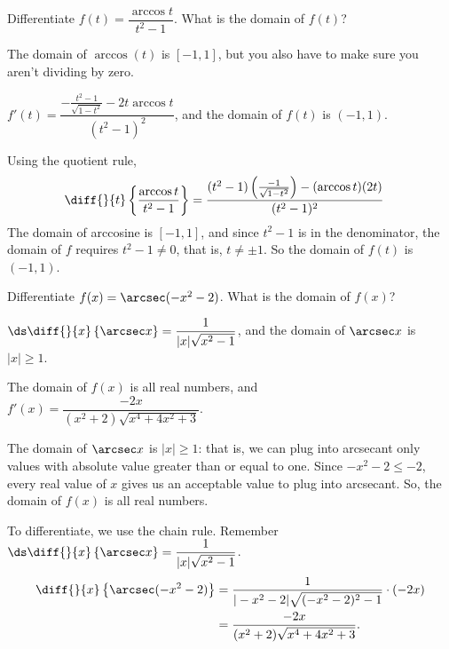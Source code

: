 \begin{Mquestion}
Differentiate $f(t)=\dfrac{\arccos t}{t^2-1}$. What is the domain of $f(t)$?
\end{Mquestion}
\begin{hint}
The domain of $\arccos(t)$ is $[-1,1]$, but you also have to make sure you aren't dividing by zero.
\end{hint}
\begin{answer}
$f'(t)=\dfrac{-\frac{t^2-1}{\sqrt{1-t^2}}-2t\arccos t}{(t^2-1)^2}$, and the domain of $f(t)$ is $(-1,1)$.
\end{answer}
\begin{solution}
Using the quotient rule,
\begin{align*}
\diff{}{t}\left\{\dfrac{\arccos t}{t^2-1}\right\}&=
\frac{(t^2-1)\left(\frac{-1}{\sqrt{1-t^2}}\right)-(\arccos t)(2t)}{(t^2-1)^2}
\end{align*}
The domain of arccosine is $[-1,1]$, and since $t^2-1$ is in the denominator, the domain of $f$ requires $t^2-1 \neq 0$, that is, $t \neq \pm 1$. So the domain of $f(t)$ is $(-1,1)$.
\end{solution}



\begin{question}
Differentiate $f(x)=\arcsec(-x^2-2)$. What is the domain of $f(x)$?
\end{question}
\begin{hint}
$\ds\diff{}{x}\left\{\arcsec x\right\} = \dfrac{1}{|x|\sqrt{x^2-1}}$, and the domain of $\arcsec x$ is $|x|\ge1$.
\end{hint}
\begin{answer}
The domain of $f(x)$ is all real numbers, and
$f'(x)=\dfrac{-2x}{(x^2+2)\sqrt{x^4+4x^2+3}}$.
\end{answer}
\begin{solution}
The domain of $\arcsec x$ is $|x| \geq 1$: that is, we can plug into arcsecant only values with absolute value greater than or equal to one. Since $-x^2-2 \leq -2$, every real value of $x$ gives us an acceptable value to plug into arcsecant. So, the domain of $f(x)$ is all real numbers.

To differentiate, we use the chain rule. Remember $\ds\diff{}{x}\left\{\arcsec x\right\} = \dfrac{1}{|x|\sqrt{x^2-1}}$.
\begin{align*}
\diff{}{x}\left\{\arcsec(-x^2-2)\right\}&=
\dfrac{1}{|-x^2-2|\sqrt{(-x^2-2)^2-1}}\cdot(-2x)\\
&=\dfrac{-2x}{(x^2+2)\sqrt{x^4+4x^2+3}}.
\end{align*}
\end{solution}





